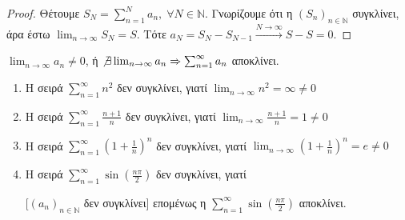 
\begin{proof}
\item {}
    Θέτουμε $ S_{N} = \sum_{n=1}^{N} a_{n}, \; \forall N \in \mathbb{N} $. Γνωρίζουμε 
    ότι η $ {(S_{n})}_{n \in \mathbb{N}} $ συγκλίνει, άρα έστω 
    $ \lim_{n \to \infty} S_{N} = S$.
    Τότε $ a_{N} = S_{N}-S_{N-1} \xrightarrow{N \to \infty} S-S = 0 $.
\end{proof}

\begin{cor}[Αντιθετοαντίστροφο]
    $ \lim_{n \to \infty} a_{n} \neq 0 $, ή $ \not \exists \lim_{n \to \infty} a_{n} 
    \Rightarrow \sum_{n=1}^{\infty} a_{n} $ αποκλίνει.
\end{cor}

\begin{examples}
    \begin{enumerate}
        \item Η σειρά $ \sum_{n=1}^{\infty} n^{2} $ δεν συγκλίνει, γιατί 
            $ \lim_{n \to \infty} n^{2} = \infty \neq 0$
        \item Η σειρά $ \sum_{n=1}^{\infty} \frac{n+1}{n} $ δεν συγκλίνει, γιατί 
            $ \lim_{n \to \infty} \frac{n+1}{n} = 1 \neq 0 $
        \item Η σειρά $ \sum_{n=1}^{\infty} (1 + \frac{1}{n} )^{n} $ δεν συγκλίνει, 
            γιατί $ \lim_{n \to \infty} (1+ \frac{1}{n} )^{n} = e \neq 0 $
        \item Η σειρά $ \sum_{n=1}^{\infty} \sin{\left(\frac{n \pi}{2}\right)} $ 
            δεν συγκλίνει, γιατί 

            \begin{minipage}{0.55\textwidth}
            \end{minipage}

            [$ {(a_{n})}_{n \in \mathbb{N}} $ δεν συγκλίνει]
            επομένως η $ \sum_{n=1}^{\infty} \sin{\left(\frac{n \pi}{2}\right) } $ 
            αποκλίνει.
    \end{enumerate}
\end{examples}

